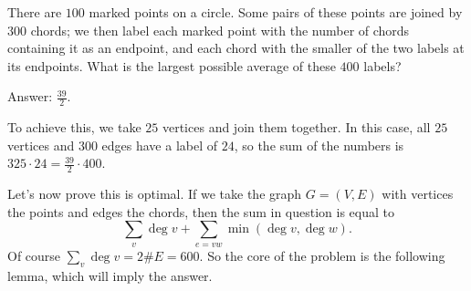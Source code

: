 There are $100$ marked points on a circle.
Some pairs of these points are joined by $300$ chords;
we then label each marked point with the number of chords
containing it as an endpoint, and each chord
with the smaller of the two labels at its endpoints.
What is the largest possible average of these $400$ labels?

Answer: $\frac{39}{2}$.

To achieve this, we take $25$ vertices and join them together.
In this case, all $25$ vertices and $300$ edges have a label
of $24$, so the sum of the numbers is $325 \cdot 24 = \frac{39}{2} \cdot 400$.

Let's now prove this is optimal.
If we take the graph $G = (V,E)$ with vertices the points and edges the chords,
then the sum in question is equal to
\[ \sum_v \deg v + \sum_{e = vw} \min \left( \deg v, \deg w \right). \]
Of course $\sum_v \deg v = 2 \# E = 600$.
So the core of the problem is the following lemma,
which will imply the answer.
